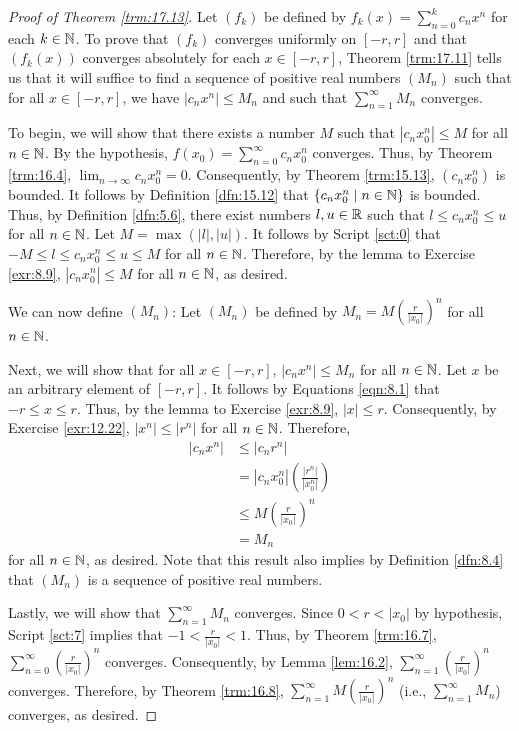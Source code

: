 \documentclass[../main.tex]{subfiles}
\begin{document}
\begin{theorem}
\begin{proof}[Proof of Theorem \ref{trm:17.13}]
        Let $(f_k)$ be defined by $f_k(x)=\sum_{n=0}^kc_nx^n$ for each $k\in\mathbb{N}$. To prove that $(f_k)$ converges uniformly on $[-r,r]$ and that $(f_k(x))$ converges absolutely for each $x\in[-r,r]$, Theorem \ref{trm:17.11} tells us that it will suffice to find a sequence of positive real numbers $(M_n)$ such that for all $x\in[-r,r]$, we have $|c_nx^n|\leq M_n$ and such that $\sum_{n=1}^\infty M_n$ converges.\par\smallskip
        To begin, we will show that there exists a number $M$ such that $|c_nx_0^n|\leq M$ for all $n\in\mathbb{N}$. By the hypothesis, $f(x_0)=\sum_{n=0}^\infty c_nx_0^n$ converges. Thus, by Theorem \ref{trm:16.4}, $\lim_{n\to\infty}c_nx_0^n=0$. Consequently, by Theorem \ref{trm:15.13}, $(c_nx_0^n)$ is bounded. It follows by Definition \ref{dfn:15.12} that $\{c_nx_0^n\mid n\in\mathbb{N}\}$ is bounded. Thus, by Definition \ref{dfn:5.6}, there exist numbers $l,u\in\mathbb{R}$ such that $l\leq c_nx_0^n\leq u$ for all $n\in\mathbb{N}$. Let $M=\max(|l|,|u|)$. It follows by Script \ref{sct:0} that $-M\leq l\leq c_nx_0^n\leq u\leq M$ for all $n\in\mathbb{N}$. Therefore, by the lemma to Exercise \ref{exr:8.9}, $|c_nx_0^n|\leq M$ for all $n\in\mathbb{N}$, as desired.\par
        We can now define $(M_n)$: Let $(M_n)$ be defined by $M_n=M(\frac{r}{|x_0|})^n$ for all $n\in\mathbb{N}$.\par
        Next, we will show that for all $x\in[-r,r]$, $|c_nx^n|\leq M_n$ for all $n\in\mathbb{N}$. Let $x$ be an arbitrary element of $[-r,r]$. It follows by Equations \ref{eqn:8.1} that $-r\leq x\leq r$. Thus, by the lemma to Exercise \ref{exr:8.9}, $|x|\leq r$. Consequently, by Exercise \ref{exr:12.22}, $|x^n|\leq|r^n|$ for all $n\in\mathbb{N}$. Therefore,
        \begin{align*}
            |c_nx^n| &\leq |c_nr^n|\\
            &= |c_nx_0^n|\left( \frac{|r^n|}{|x_0^n|} \right)\\
            &\leq M\left( \frac{r}{|x_0|} \right)^n\\
            &= M_n
        \end{align*}
        for all $n\in\mathbb{N}$, as desired. Note that this result also implies by Definition \ref{dfn:8.4} that $(M_n)$ is a sequence of positive real numbers.\par
        Lastly, we will show that $\sum_{n=1}^\infty M_n$ converges. Since $0<r<|x_0|$ by hypothesis, Script \ref{sct:7} implies that $-1<\frac{r}{|x_0|}<1$. Thus, by Theorem \ref{trm:16.7}, $\sum_{n=0}^\infty(\frac{r}{|x_0|})^n$ converges. Consequently, by Lemma \ref{lem:16.2}, $\sum_{n=1}^\infty(\frac{r}{|x_0|})^n$ converges. Therefore, by Theorem \ref{trm:16.8}, $\sum_{n=1}^\infty M(\frac{r}{|x_0|})^n$ (i.e., $\sum_{n=1}^\infty M_n$) converges, as desired.\par\medskip

\end{proof}
\end{theorem}
\end{document}
